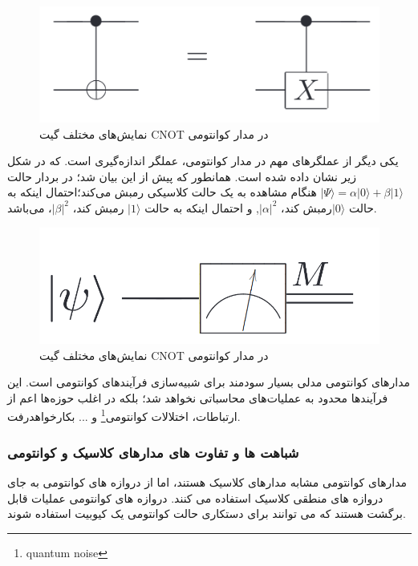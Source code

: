\documentclass{book}
\begin{document}
\begin{figure}[htbp]
	\centering
	\includegraphics[width=\linewidth]{cnot in circuit.png}
	\caption{نمایش‌های مختلف گیت CNOT در مدار کوانتومی}
	\label{fig:my_image}
\end{figure}

یکی دیگر از عملگر‌های مهم در مدار کوانتومی، عملگر اندازه‌گیری است. که در شکل زیر نشان داده شده است. همانطور که پیش از این بیان شد؛ در بردار حالت $\vert \Psi \rangle = \alpha \vert 0 \rangle + \beta \vert 1 \rangle$ هنگام مشاهده به یک حالت کلاسیکی رمبش می‌کند؛‌احتمال اینکه به حالت $\vert 0 \rangle$رمبش کند، $\vert \alpha \vert ^2$, و احتمال اینکه به حالت $\vert 1 \rangle$ رمبش کند، $\vert \beta \vert ^2$، می‌باشد.

 
\begin{figure}[ht]
	\centering
	\includegraphics[width=\linewidth, scale=0.5]{measurment.png}
	\caption{نمایش‌های مختلف گیت CNOT در مدار کوانتومی}
	\label{fig:my_image}
\end{figure}


مدار‌های کوانتومی مدلی بسیار سودمند برای شبیه‌سازی‌ فرآیندهای کوانتومی‌ است. این فرآیندها محدود به عملیات‌های محاسباتی نخواهد شد؛ بلکه در اغلب حوزه‌‌ها اعم از ارتباطات، اختلالات کوانتومی\footnote{quantum noise} و ... بکار‌خواهدرفت.
\subsubsection{شباهت ها و تفاوت های مدارهای کلاسیک و کوانتومی}
مدارهای کوانتومی مشابه مدارهای کلاسیک هستند، اما از دروازه های کوانتومی به جای دروازه های منطقی کلاسیک استفاده می کنند. دروازه های کوانتومی عملیات قابل برگشت هستند که می توانند برای دستکاری حالت کوانتومی یک کیوبیت استفاده شوند.
\end{document}
